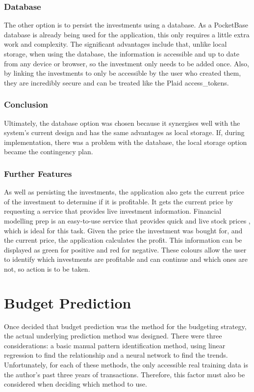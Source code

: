 \subsubsection{Database}
The other option is to persist the investments using a database. As a PocketBase database is already being used for the application, this only requires a little extra work and complexity. The significant advantages include that, unlike local storage, when using the database, the information is accessible and up to date from any device or browser, so the investment only needs to be added once. Also, by linking the investments to only be accessible by the user who created them, they are incredibly secure and can be treated like the Plaid access\_tokens.

\subsubsection{Conclusion}
Ultimately, the database option was chosen because it synergises well with the system's current design and has the same advantages as local storage. If, during implementation, there was a problem with the database, the local storage option became the contingency plan.

\subsubsection{Further Features}
As well as persisting the investments, the application also gets the current price of the investment to determine if it is profitable. It gets the current price by requesting a service that provides live investment information. Financial modelling prep is an easy-to-use service that provides quick and live stock prices \cite{FMP}, which is ideal for this task. Given the price the investment was bought for, and the current price, the application calculates the profit. This information can be displayed as green for positive and red for negative. These colours allow the user to identify which investments are profitable and can continue and which ones are not, so action is to be taken.

\section{Budget Prediction}
\label{sec:BudgetPrediction}
Once decided that budget prediction was the method for the budgeting strategy, the actual underlying prediction method was designed. There were three considerations: a basic manual pattern identification method, using linear regression to find the relationship and a neural network to find the trends. Unfortunately, for each of these methods, the only accessible real training data is the author's past three years of transactions. Therefore, this factor must also be considered when deciding which method to use.

